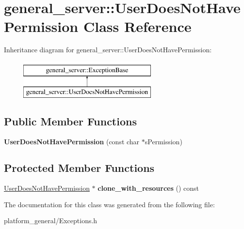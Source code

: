 \hypertarget{classgeneral__server_1_1UserDoesNotHavePermission}{\section{general\-\_\-server\-:\-:\-User\-Does\-Not\-Have\-Permission \-Class \-Reference}
\label{classgeneral__server_1_1UserDoesNotHavePermission}
}
\-Inheritance diagram for general\-\_\-server\-:\-:\-User\-Does\-Not\-Have\-Permission\-:\begin{figure}[H]
\begin{center}
\leavevmode
\includegraphics[height=2.000000cm]{classgeneral__server_1_1UserDoesNotHavePermission}
\end{center}
\end{figure}
\subsection*{\-Public \-Member \-Functions}
\begin{DoxyCompactItemize}
\item 
\hypertarget{classgeneral__server_1_1UserDoesNotHavePermission_a2784fcabf0dd657a144aa14bb1c70fe0}{{\bfseries \-User\-Does\-Not\-Have\-Permission} (const char $\ast$s\-Permission)}\label{classgeneral__server_1_1UserDoesNotHavePermission_a2784fcabf0dd657a144aa14bb1c70fe0}

\end{DoxyCompactItemize}
\subsection*{\-Protected \-Member \-Functions}
\begin{DoxyCompactItemize}
\item 
\hypertarget{classgeneral__server_1_1UserDoesNotHavePermission_aa9280d13db680d6ec2ebf20626e044ce}{\hyperlink{classgeneral__server_1_1UserDoesNotHavePermission}{\-User\-Does\-Not\-Have\-Permission} $\ast$ {\bfseries clone\-\_\-with\-\_\-resources} () const }\label{classgeneral__server_1_1UserDoesNotHavePermission_aa9280d13db680d6ec2ebf20626e044ce}

\end{DoxyCompactItemize}


\-The documentation for this class was generated from the following file\-:\begin{DoxyCompactItemize}
\item 
platform\-\_\-general/\-Exceptions.\-h\end{DoxyCompactItemize}
